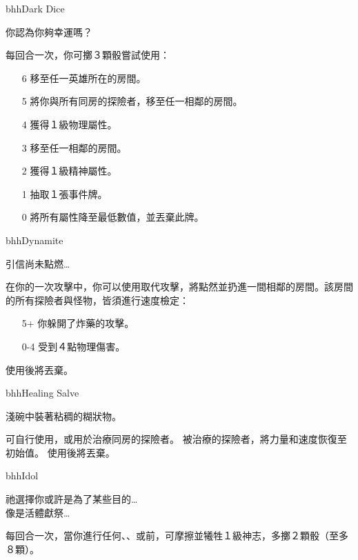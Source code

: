 \begin{ItemCard}{bhh}{Dark Dice}{}
  \begin{CardStory}
    你認為你夠幸運嗎？
  \end{CardStory}
  每回合一次，你可擲３顆骰嘗試使用\ThisName{}：
  \begin{itemize}
    \item[6] 移至任一英雄所在的房間。
    \item[5] 將你與所有同房的探險者，移至任一相鄰的房間。
    \item[4] 獲得１級物理屬性。
    \item[3] 移至任一相鄰的房間。
    \item[2] 獲得１級精神屬性。
    \item[1] 抽取１張事件牌。
    \item[0] 將所有屬性降至最低數值，並丟棄此牌。
  \end{itemize}
\end{ItemCard}%
\linebreak[0]%
\begin{ItemCard}{bhh}{Dynamite}{}
  \begin{CardStory}
    引信尚未點燃…
  \end{CardStory}
  在你的一次攻擊中，你可以使用\ThisName{}取代攻擊，將\ThisName{}點然並扔進一間相鄰的房間。該房間的所有探險者與怪物，皆須進行速度檢定：
  \begin{itemize}
    \item[5+] 你躲開了炸藥的攻擊。
    \item[0-4] 受到４點物理傷害。
  \end{itemize}
  使用後將\ThisName{}丟棄。\smallbreak
\end{ItemCard}%
\linebreak[0]%
\begin{ItemCard}{bhh}{Healing Salve}{}
  \begin{CardStory}
    淺碗中裝著粘稠的糊狀物。
  \end{CardStory}
  可自行使用，或用於治療同房的探險者。\smallbreak
  被\ThisName{}治療的探險者，將力量和速度恢復至初始值。\smallbreak
  使用後將\ThisName{}丟棄。\smallbreak
\end{ItemCard}%
\linebreak[0]%
\begin{ItemCard}{bhh}{Idol}{}
  \begin{CardStory}
    祂選擇你或許是為了某些目的…\\
    像是活體獻祭…
  \end{CardStory}
  每回合一次，當你進行任何、、或前，可摩擦\ThisName{}並犧牲１級神志，多擲２顆骰（至多８顆）。\smallbreak
\end{ItemCard}%
